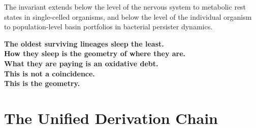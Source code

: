\documentclass[10pt, a4paper]{article}
\begin{document}
\begin{mdframed}[
  backgroundcolor=invariantbox,
  linecolor=headergreen,
  linewidth=1pt,
  innertopmargin=0.8em,
  innerbottommargin=0.8em,
  innerleftmargin=1.0em,
  innerrightmargin=1.0em
]
\medskip
The invariant extends below the level of
the nervous system to metabolic rest
states in single-celled organisms, and
below the level of the individual
organism to population-level basin
portfolios in bacterial persister
dynamics.

\medskip
\textbf{The oldest surviving lineages
sleep the least.}\\
\textbf{How they sleep is the geometry
of where they are.}\\
\textbf{What they are paying is an
oxidative debt.}\\
\textbf{This is not a coincidence.}\\
\textbf{This is the geometry.}
\end{mdframed}

\section{The Unified Derivation Chain}
\label{sec:chain}
\end{document}
